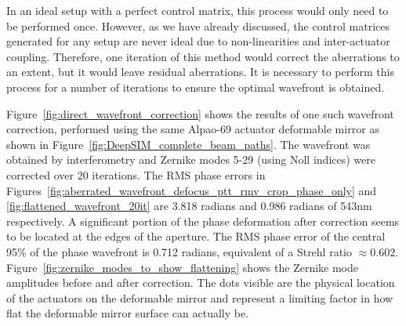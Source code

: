 In an ideal setup with a perfect control matrix, this process would only need to be performed once. However, as we have already discussed, the control matrices generated for any setup are never ideal due to non-linearities and inter-actuator coupling. Therefore, one iteration of this method would correct the aberrations to an extent, but it would leave residual aberrations. It is necessary to perform this process for a number of iterations to ensure the optimal wavefront is obtained. 

Figure~\ref{fig:direct_wavefront_correction} shows the results of one such wavefront correction, performed using the same Alpao-69 actuator deformable mirror as shown in Figure~\ref{fig:DeepSIM_complete_beam_paths}. The wavefront was 
obtained by interferometry and Zernike modes 5-29 (using Noll indices) were corrected over 20 iterations. The RMS phase errors in Figures~\ref{fig:aberrated_wavefront_defocus_ptt_rmv_crop_phase_only} and \ref{fig:flattened_wavefront_20it} are 3.818 radians and 0.986 radians of 543nm respectively. A significant portion of the phase deformation after correction seems to be located at the edges of the aperture. The RMS phase error of the central 95\% of the phase wavefront is 0.712 radians, equivalent of a Strehl ratio $\approx 0.602$. Figure~\ref{fig:zernike_modes_to_show_flattening}
shows the Zernike mode amplitudes before and after correction. The dots visible are the physical location of the actuators on the deformable mirror and represent a limiting factor in how flat the deformable mirror surface can actually be. 

